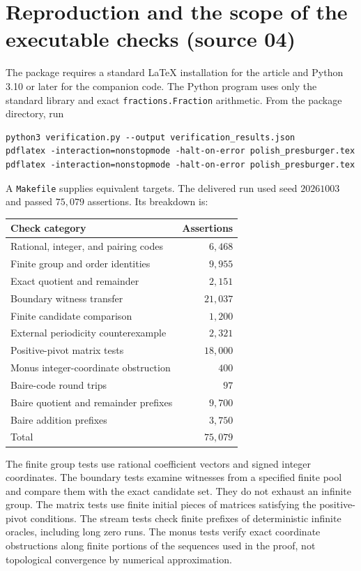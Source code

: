 \documentclass[11pt]{article}
\numberwithin{equation}{section}
\theoremstyle{definition}
\theoremstyle{remark}
\newcommand{\code}[1]{\texttt{\small #1}}
\begin{document}
\section{Reproduction and the scope of the executable checks (source 04)}\label{pma:pr:app:reproduction}

The package requires a standard LaTeX installation for the article and
Python 3.10 or later for the companion code. The Python program uses only
the standard library and exact \code{fractions.Fraction} arithmetic.
From the package directory, run
\begin{lstlisting}
python3 verification.py --output verification_results.json
pdflatex -interaction=nonstopmode -halt-on-error polish_presburger.tex
pdflatex -interaction=nonstopmode -halt-on-error polish_presburger.tex
\end{lstlisting}
A \code{Makefile} supplies equivalent targets. The delivered run used seed
$20261003$ and passed $75{,}079$ assertions. Its breakdown is:

\begin{center}
\begin{tabular}{@{}lr@{}}
\toprule
Check category & Assertions\\
\midrule
Rational, integer, and pairing codes & $6{,}468$\\
Finite group and order identities & $9{,}955$\\
Exact quotient and remainder & $2{,}151$\\
Boundary witness transfer & $21{,}037$\\
Finite candidate comparison & $1{,}200$\\
External periodicity counterexample & $2{,}321$\\
Positive-pivot matrix tests & $18{,}000$\\
Monus integer-coordinate obstruction & $400$\\
Baire-code round trips & $97$\\
Baire quotient and remainder prefixes & $9{,}700$\\
Baire addition prefixes & $3{,}750$\\
\midrule
Total & $75{,}079$\\
\bottomrule
\end{tabular}
\end{center}

The finite group tests use rational coefficient vectors and signed integer
coordinates. The boundary tests examine witnesses from a specified finite
pool and compare them with the exact candidate set. They do not exhaust
an infinite group. The matrix tests use finite initial pieces of matrices
satisfying the positive-pivot conditions. The stream tests check finite
prefixes of deterministic infinite oracles, including long zero runs.
The monus tests verify exact coordinate obstructions along finite portions
of the sequences used in the proof, not topological convergence by numerical
approximation.
\end{document}
